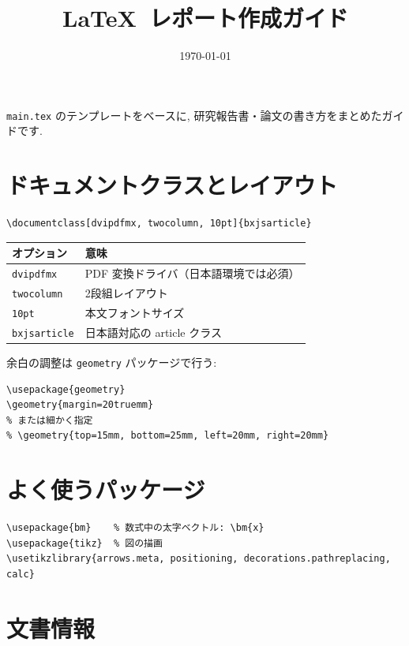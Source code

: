 \documentclass[dvipdfmx, twocolumn, 10pt]{bxjsarticle}
\title{\textbf{\LaTeX\ レポート作成ガイド}}
\author{}
\date{\today}
\begin{document}
\maketitle

\texttt{main.tex} のテンプレートをベースに, 研究報告書・論文の書き方をまとめたガイドです.

\section{ドキュメントクラスとレイアウト}

\begin{lstlisting}
\documentclass[dvipdfmx, twocolumn, 10pt]{bxjsarticle}
\end{lstlisting}

\begin{tabularx}{\linewidth}{lX}
\hline
オプション & 意味 \\
\hline
\texttt{dvipdfmx}    & PDF 変換ドライバ（日本語環境では必須） \\
\texttt{twocolumn}   & 2段組レイアウト \\
\texttt{10pt}        & 本文フォントサイズ \\
\texttt{bxjsarticle} & 日本語対応の article クラス \\
\hline
\end{tabularx}

\medskip
余白の調整は \texttt{geometry} パッケージで行う:

\begin{lstlisting}
\usepackage{geometry}
\geometry{margin=20truemm}
% または細かく指定
% \geometry{top=15mm, bottom=25mm, left=20mm, right=20mm}
\end{lstlisting}

\section{よく使うパッケージ}

\begin{lstlisting}
\usepackage{bm}    % 数式中の太字ベクトル: \bm{x}
\usepackage{tikz}  % 図の描画
\usetikzlibrary{arrows.meta, positioning, decorations.pathreplacing, calc}
\end{lstlisting}

\section{文書情報}
\end{document}
